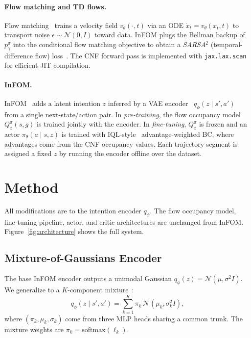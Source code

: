 \documentclass{article}
\newcommand{\base}{InFOM}
\begin{document}
\paragraph{Flow matching and TD flows.}
Flow matching~\cite{lipman2023flow,liu2023rectified,
albergo2023stochastic} trains a velocity field
$v_\theta(\cdot,t)$ via an ODE
$\dot{x}_t = v_\theta(x_t,t)$
to transport noise $\epsilon\sim\mathcal{N}(0,I)$ toward data.
\base{} plugs the Bellman backup of $p^\pi_\gamma$ into the
conditional flow matching objective to obtain a
\emph{SARSA$^2$} (temporal-difference flow) loss~\cite{ma2023vip,
farebrother2025tdflows}.
The CNF forward pass is implemented with
\texttt{jax.lax.scan}~\cite{bradbury2018jax} for efficient
JIT compilation.

\paragraph{InFOM.}
\base{}~\cite{zheng2025infom} adds a latent intention $z$
inferred by a VAE encoder~\cite{kingma2013vae}
$q_\phi(z \mid s',a')$ from a single next-state/action pair.
In \emph{pre-training}, the flow occupancy model $Q^\pi_z(s,g)$
is trained jointly with the encoder.
In \emph{fine-tuning}, $Q^\pi_z$ is frozen and an actor
$\pi_\theta(a \mid s,z)$ is trained with
IQL-style~\cite{kostrikov2021iql} advantage-weighted BC,
where advantages come from the CNF occupancy values.
Each trajectory segment is assigned a fixed $z$ by running
the encoder offline over the dataset.

\section{Method}
\label{sec:method}

All modifications are to the intention encoder $q_\phi$.
The flow occupancy model, fine-tuning pipeline, actor, and
critic architectures are unchanged from \base{}.
Figure~\ref{fig:architecture} shows the full system.

\subsection{Mixture-of-Gaussians Encoder}
\label{sec:mog}

The base \base{} encoder outputs a unimodal Gaussian
$q_\phi(z) = \mathcal{N}(\mu,\sigma^2 I)$.
We generalize to a $K$-component mixture~\cite{bishop2006prml}:
\begin{equation}
    q_\phi(z \mid s', a') = \sum_{k=1}^{K} \pi_k
    \,\mathcal{N}(\mu_k, \sigma_k^2 I),
    \label{eq:mog}
\end{equation}
where $(\pi_k,\mu_k,\sigma_k)$ come from three MLP heads sharing a
common trunk.
The mixture weights are $\pi_k = \mathrm{softmax}(\ell_k)$.
\end{document}
